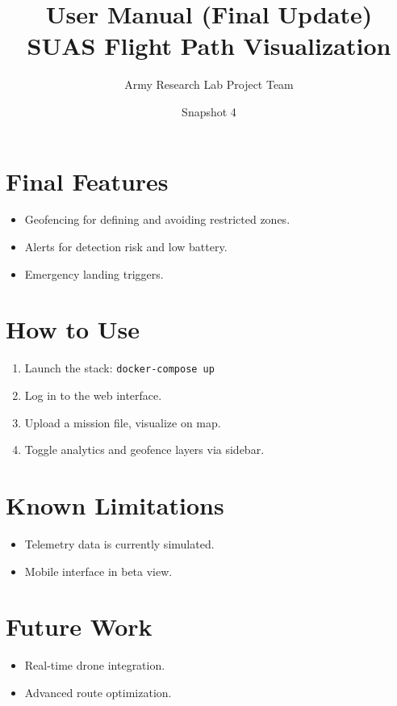 \documentclass[12pt]{article}
\title{User Manual (Final Update)\\SUAS Flight Path Visualization}
\author{Army Research Lab Project Team}
\date{Snapshot 4}
\begin{document}
\maketitle

\section{Final Features}
\begin{itemize}
  \item Geofencing for defining and avoiding restricted zones.
  \item Alerts for detection risk and low battery.
  \item Emergency landing triggers.
\end{itemize}

\section{How to Use}
\begin{enumerate}
  \item Launch the stack: \texttt{docker-compose up}
  \item Log in to the web interface.
  \item Upload a mission file, visualize on map.
  \item Toggle analytics and geofence layers via sidebar.
\end{enumerate}

\section{Known Limitations}
\begin{itemize}
  \item Telemetry data is currently simulated.
  \item Mobile interface in beta view.
\end{itemize}

\section{Future Work}
\begin{itemize}
  \item Real-time drone integration.
  \item Advanced route optimization.
\end{itemize}
\end{document}
